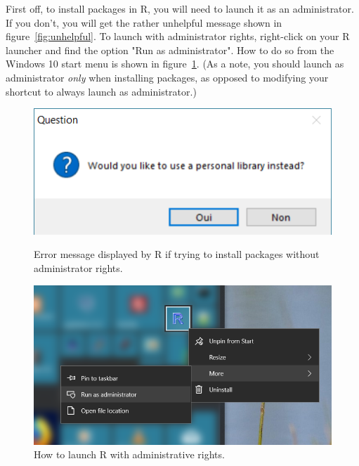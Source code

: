 \documentclass{report}
\begin{document}
		First off, to install packages in R, you will need to launch it as an administrator. If you don't, you will get the rather unhelpful message shown in figure~\ref{fig:unhelpful}. To launch with administrator rights, right-click on your R launcher and find the option "Run as administrator". How to do so from the Windows 10 start menu is shown in figure~\ref{fig:admin}. (As a note, you should launch as administrator \emph{only} when installing packages, as opposed to modifying your shortcut to always launch as administrator.)
		\begin{figure}[h]
			\centering
			\begin{minipage}{.475\textwidth}
				\centering
				\includegraphics[width=.8\linewidth]{unhelpful.png}
				\caption{Error message displayed by R if trying to install packages without administrator rights.}
				\label{fig:unhelpful}
			\end{minipage}
			\hfill
			\begin{minipage}{.475\textwidth}
				\centering
				\includegraphics[width=.8\linewidth]{admin.png}
				\caption{How to launch R with administrative rights.}
				\label{fig:admin}
			\end{minipage}
		\end{figure}
	
\end{document}

